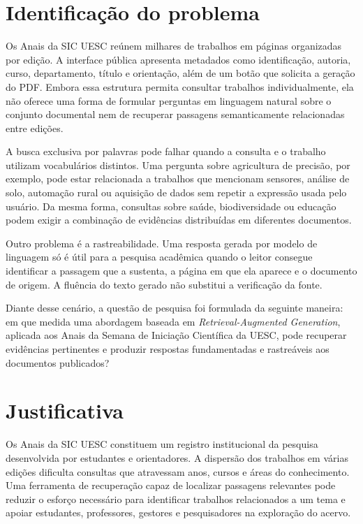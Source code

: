 \section{Identificação do problema}

Os Anais da SIC UESC reúnem milhares de trabalhos em páginas organizadas por edição. A interface pública apresenta metadados como identificação, autoria, curso, departamento, título e orientação, além de um botão que solicita a geração do PDF. Embora essa estrutura permita consultar trabalhos individualmente, ela não oferece uma forma de formular perguntas em linguagem natural sobre o conjunto documental nem de recuperar passagens semanticamente relacionadas entre edições.

A busca exclusiva por palavras pode falhar quando a consulta e o trabalho utilizam vocabulários distintos. Uma pergunta sobre agricultura de precisão, por exemplo, pode estar relacionada a trabalhos que mencionam sensores, análise de solo, automação rural ou aquisição de dados sem repetir a expressão usada pelo usuário. Da mesma forma, consultas sobre saúde, biodiversidade ou educação podem exigir a combinação de evidências distribuídas em diferentes documentos.

Outro problema é a rastreabilidade. Uma resposta gerada por modelo de linguagem só é útil para a pesquisa acadêmica quando o leitor consegue identificar a passagem que a sustenta, a página em que ela aparece e o documento de origem. A fluência do texto gerado não substitui a verificação da fonte.

Diante desse cenário, a questão de pesquisa foi formulada da seguinte maneira: em que medida uma abordagem baseada em \textit{Retrieval-Augmented Generation}, aplicada aos Anais da Semana de Iniciação Científica da UESC, pode recuperar evidências pertinentes e produzir respostas fundamentadas e rastreáveis aos documentos publicados?

\section{Justificativa}

Os Anais da SIC UESC constituem um registro institucional da pesquisa desenvolvida por estudantes e orientadores. A dispersão dos trabalhos em várias edições dificulta consultas que atravessam anos, cursos e áreas do conhecimento. Uma ferramenta de recuperação capaz de localizar passagens relevantes pode reduzir o esforço necessário para identificar trabalhos relacionados a um tema e apoiar estudantes, professores, gestores e pesquisadores na exploração do acervo.

